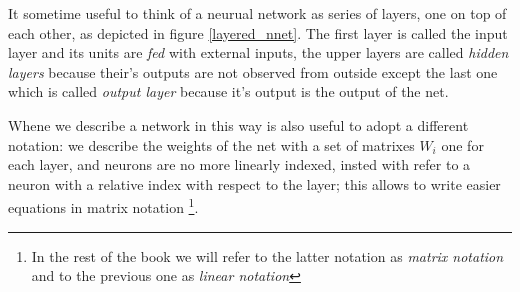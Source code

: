 It sometime useful to think of a neurual network as series of layers, one on top of each other, as depicted in figure \ref{layered_nnet}. The first layer is called the input layer and its units are \textit{fed}
with external inputs, the upper layers are called \textit{hidden layers} because their's outputs are not observed from outside except the last one which is called \textit{output layer} because it's output 
is the output of the net.

Whene we describe a network in this way is also useful to adopt a different notation: we describe the weights of the net with a set of matrixes $W_i$ one for each layer, and neurons are no more
linearly indexed, insted with refer to a neuron with a relative index with respect to the layer; this allows to write easier equations in matrix notation
\footnote{In the rest of the book we will refer to the latter notation as \textsl{matrix notation} and to the previous one as \textsl{linear notation}}.


